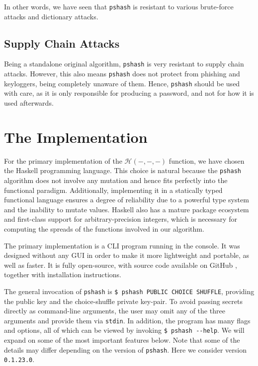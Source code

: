 \documentclass[a4paper, 10pt]{article}
\theoremstyle{plain}
\theoremstyle{definition}
\newcommand{\h}{\mathcal{H}}
\begin{document}
In other words, we have seen that \texttt{pshash} is resistant to various brute-force attacks and dictionary attacks.

\subsection{Supply Chain Attacks}

Being a standalone original algorithm, \texttt{pshash} is very resistant to supply chain attacks. However, this also means \texttt{pshash} does not protect from phishing and keyloggers, being completely unaware of them. Hence, \texttt{pshash} should be used with care, as it is only responsible for producing a password, and not for how it is used afterwards.

\section{The Implementation} \label{impl}

For the primary implementation of the $\h(-, -, -)$ function, we have chosen the Haskell programming language. This choice is natural because the \texttt{pshash} algorithm does not involve any mutation and hence fits perfectly into the functional paradigm. Additionally, implementing it in a statically typed functional language ensures a degree of reliability due to a powerful type system and the inability to mutate values. Haskell also has a mature package ecosystem and first-class support for arbitrary-precision integers, which is necessary for computing the spreads of the functions involved in our algorithm.

The primary implementation is a CLI program running in the console. It was designed without any GUI in order to make it more lightweight and portable, as well as faster. It is fully open-source, with source code available on GitHub \cite{pshash-src}, together with installation instructions.

The general invocation of \texttt{pshash} is \verb|$ pshash PUBLIC CHOICE SHUFFLE|, providing the public key and the choice-shuffle private key-pair. To avoid passing secrets directly as command-line arguments, the user may omit any of the three arguments and provide them via \texttt{stdin}. In addition, the program has many flags and options, all of which can be viewed by invoking \verb|$ pshash --help|. We will expand on some of the most important features below. Note that some of the details may differ depending on the version of \texttt{pshash}. Here we consider version \texttt{0.1.23.0}.
\end{document}
